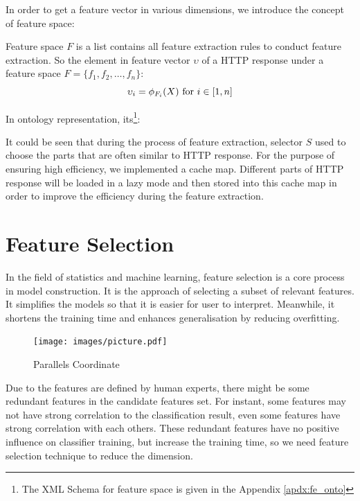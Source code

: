 In order to get a feature vector in various dimensions, we introduce the concept of feature space:
\begin{defn}
	Feature space $F$ is a list contains all feature extraction rules to conduct feature extraction.	So the element in feature vector $\upsilon$ of a HTTP response under a feature space $F=\{f_1, f_2, \dots, f_n\}$:
	\begin{equation}
		\upsilon_i = \phi_{F_i}(X) \mbox{\space for $i \in [1,n]$}
	\end{equation}
\end{defn}

In ontology representation, its\footnote{The XML Schema for feature space is given in the Appendix \ref{apdx:fe_onto} }:



It could be seen that during the process of feature extraction, selector $S$ used to choose the parts that are often similar to HTTP response. For the purpose of ensuring high efficiency, we implemented a cache map. Different parts of HTTP response will be loaded in a lazy mode and then stored into this cache map in order to improve the efficiency during the feature extraction.

\section{Feature Selection}
In the field of statistics and machine learning, feature selection is a core process in model construction. It is the approach of selecting a subset of relevant features. It simplifies the models so that it is easier for user to interpret. Meanwhile, it shortens the training time and enhances generalisation by reducing overfitting\cite{james2013introduction}.

\begin{figure}[htbp]
	\centering
	\texttt{[image: images/picture.pdf]}
	\caption{Parallels Coordinate}\label{fig:feature_selection:pd}
\end{figure}

Due to the features are defined by human experts, there might be some redundant features in the candidate features set. For instant, some features may not have strong correlation to the classification result, even some features have strong correlation with each others. These redundant features have no positive influence on classifier training, but increase the training time, so we need feature selection technique to reduce the dimension.

